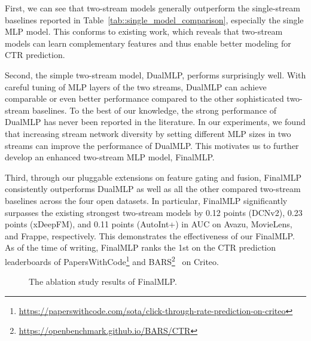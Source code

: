 \documentclass[letterpaper]{article} \usepackage{aaai23}  \usepackage{times}  \usepackage{helvet}  \usepackage{courier}  \usepackage[hyphens]{url}  \usepackage{graphicx} \urlstyle{rm} \def\UrlFont{\rm}  \usepackage{natbib}  \usepackage{caption} \frenchspacing  \setlength{\pdfpagewidth}{8.5in}  \setlength{\pdfpageheight}{11in}  \usepackage{algorithm}
\begin{document}
First, we can see that two-stream models generally outperform the single-stream baselines reported in Table~\ref{tab::single_model_comparison}, especially the single MLP model. This conforms to existing work, which reveals that two-stream models can learn complementary features and thus enable better modeling for CTR prediction.

Second, the simple two-stream model, DualMLP, performs surprisingly well. With careful tuning of MLP layers of the two streams, DualMLP can achieve comparable or even better performance compared to the other sophisticated two-stream baselines. To the best of our knowledge, the strong performance of DualMLP has never been reported in the literature. In our experiments, we found that increasing stream network diversity by setting different MLP sizes in two streams can improve the performance of DualMLP. This motivates us to further develop an enhanced two-stream MLP model, FinalMLP. 

Third, through our pluggable extensions on feature gating and fusion, FinalMLP consistently outperforms DualMLP as well as all the other compared two-stream baselines across the four open datasets. In particular, FinalMLP significantly surpasses the existing strongest two-stream models by 0.12 points (DCNv2), 0.23 points (xDeepFM), and 0.11 points (AutoInt+) in AUC on Avazu, MovieLens, and Frappe, respectively. This demonstrates the effectiveness of our FinalMLP. As of the time of writing, FinalMLP ranks the 1st on the CTR prediction leaderboards of PapersWithCode\footnote{\url{https://paperswithcode.com/sota/click-through-rate-prediction-on-criteo}} and BARS\footnote{\url{https://openbenchmark.github.io/BARS/CTR}}~\cite{BARS} on Criteo.

    













\begin{figure*}[!t]
\centering
  \vspace{-2ex}
	\caption{The ablation study results of FinalMLP.}
	\vspace{-1ex}
 \label{fig:ablation_studies}
\end{figure*}
\end{document}
